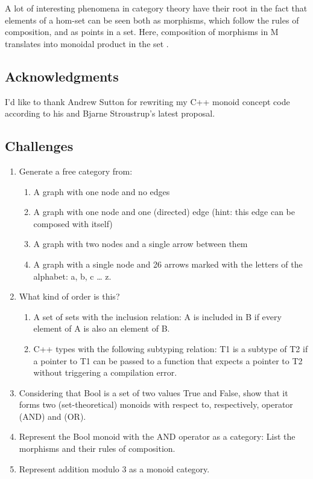 A lot of interesting phenomena in category theory have their root in the
fact that elements of a hom-set can be seen both as morphisms, which
follow the rules of composition, and as points in a set. Here,
composition of morphisms in M translates into monoidal product in the
set .

\subsection{Acknowledgments}\label{acknowledgments}

I'd like to thank Andrew Sutton for rewriting my C++ monoid concept code
according to his and Bjarne Stroustrup's latest proposal.

\subsection{Challenges}\label{challenges}

\begin{enumerate}
\item
  Generate a free category from:

  \begin{enumerate}
  \tightlist
  \item
    A graph with one node and no edges
  \item
    A graph with one node and one (directed) edge (hint: this edge can
    be composed with itself)
  \item
    A graph with two nodes and a single arrow between them
  \item
    A graph with a single node and 26 arrows marked with the letters of
    the alphabet: a, b, c \ldots{} z.
  \end{enumerate}
\item
  What kind of order is this?

  \begin{enumerate}
  \tightlist
  \item
    A set of sets with the inclusion relation: A is included in B if
    every element of A is also an element of B.
  \item
    C++ types with the following subtyping relation: T1 is a subtype of
    T2 if a pointer to T1 can be passed to a function that expects a
    pointer to T2 without triggering a compilation error.
  \end{enumerate}
\item
  Considering that Bool is a set of two values True and False, show that
  it forms two (set-theoretical) monoids with respect to, respectively,
  operator \code{\&\&} (AND) and \code{\textbar{}\textbar{}} (OR).
\item
  Represent the Bool monoid with the AND operator as a category: List
  the morphisms and their rules of composition.
\item
  Represent addition modulo 3 as a monoid category.
\end{enumerate}